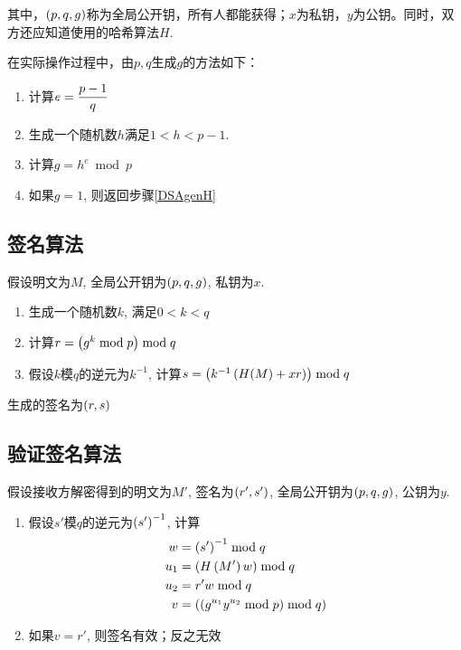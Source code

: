 其中，$\left( {p, q, g}\right)$称为全局公开钥，所有人都能获得；$x$为私钥，$y$为公钥。同时，双方还应知道使用的哈希算法$H$.\par
在实际操作过程中，由$p, q$生成$g$的方法如下：
\begin{enumerate}
    \item 计算$\displaystyle e=\frac{p-1}{q}$
    \item\label{DSAgenH} 生成一个随机数$h$满足$1<h<p-1$.
    \item 计算$g=h^e\bmod{p}$
    \item 如果$g=1$, 则返回步骤\ref{DSAgenH}
\end{enumerate}
\subsection{签名算法}
假设明文为$M$, 全局公开钥为$\left( {p, q, g}\right)$, 私钥为$x$.
\begin{enumerate}
    \item 生成一个随机数$k$, 满足$0<k<q$
    \item 计算$r=\left( {g^k\bmod{p}}\right)\bmod{q}$
    \item 假设$k$模$q$的逆元为$k^{-1}$, 计算$s=\left( {k^{-1}\left( {H(M)+xr}\right)}\right)\bmod{q}$
\end{enumerate}

生成的签名为$\left( {r, s}\right)$
\subsection{验证签名算法}
假设接收方解密得到的明文为$M'$, 签名为$\left( {r', s'}\right)$, 全局公开钥为$\left( {p, q, g}\right)$, 公钥为$y$.
\begin{enumerate}
    \item 假设$s'$模$q$的逆元为$\left( {s'}\right)^{-1}$, 计算
    \begin{align*}
        w&=\left( {s'}\right)^{-1}\bmod{q}\\
        u_1&=\left( {H\left( {M'}\right)w}\right)\bmod{q}\\
        u_2&=r'w\bmod{q}\\
        v&=\left( {\left( {g^{u_1}y^{u_2}\bmod{p}}\right)\bmod{q}}\right)
    \end{align*}
    \item 如果$v=r'$, 则签名有效；反之无效
\end{enumerate}
